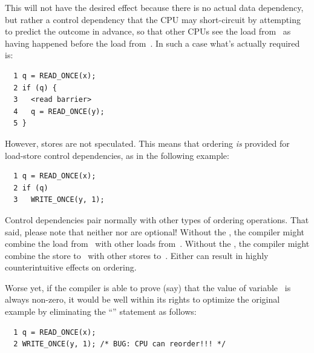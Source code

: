 This will not have the desired effect because there is no actual data
dependency, but rather a control dependency that the CPU may short-circuit
by attempting to predict the outcome in advance, so that other CPUs see
the load from~ as having happened before the load from~.
In such a case what's actually required is:

\vspace{5pt}
\begin{minipage}[t]{\columnwidth}
\scriptsize
\begin{verbatim}
  1 q = READ_ONCE(x);
  2 if (q) {
  3   <read barrier>
  4   q = READ_ONCE(y);
  5 }
\end{verbatim}
\end{minipage}
\vspace{5pt}

However, stores are not speculated.
This means that ordering \emph{is} provided for load-store control
dependencies, as in the following example:

\vspace{5pt}
\begin{minipage}[t]{\columnwidth}
\scriptsize
\begin{verbatim}
  1 q = READ_ONCE(x);
  2 if (q)
  3   WRITE_ONCE(y, 1);
\end{verbatim}
\end{minipage}
\vspace{5pt}

Control dependencies pair normally with other types of ordering operations.
That said, please note that neither  nor 
are optional!
Without the , the compiler might combine the load
from~ with other loads from~.
Without the , the compiler might combine the store
to~ with other stores to~.
Either can result in highly counterintuitive effects on ordering.

Worse yet, if the compiler is able to prove (say) that the value of
variable~ is always non-zero, it would be well within its rights
to optimize the original example by eliminating the ``'' statement
as follows:

\vspace{5pt}
\begin{minipage}[t]{\columnwidth}
\scriptsize
\begin{verbatim}
  1 q = READ_ONCE(x);
  2 WRITE_ONCE(y, 1); /* BUG: CPU can reorder!!! */
\end{verbatim}
\end{minipage}
\vspace{5pt}

